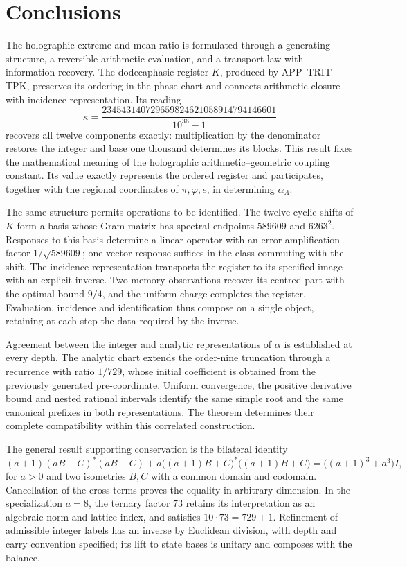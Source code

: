\section{Conclusions}
\label{paper:conclusiones}
The holographic extreme and mean ratio is formulated through a generating structure, a reversible arithmetic evaluation, and a transport law with information recovery. The dodecaphasic register \(K\), produced by APP--TRIT--TPK, preserves its ordering in the phase chart and connects arithmetic closure with incidence representation. Its reading
\[
\kappa=
\frac{234543140729659824621058914794146601}{10^{36}-1}
\]
recovers all twelve components exactly: multiplication by the denominator restores the integer and base one thousand determines its blocks. This result fixes the mathematical meaning of the holographic arithmetic--geometric coupling constant. Its value exactly represents the ordered register and participates, together with the regional coordinates of \(\pi,\varphi,e\), in determining \(\alpha_A\).

The same structure permits operations to be identified. The twelve cyclic shifts of \(K\) form a basis whose Gram matrix has spectral endpoints \(589609\) and \(6263^2\). Responses to this basis determine a linear operator with an error-amplification factor \(1/\sqrt{589609}\); one vector response suffices in the class commuting with the shift. The incidence representation transports the register to its specified image with an explicit inverse. Two memory observations recover its centred part with the optimal bound \(9/4\), and the uniform charge completes the register. Evaluation, incidence and identification thus compose on a single object, retaining at each step the data required by the inverse.

Agreement between the integer and analytic representations of \(\alpha\) is established at every depth. The analytic chart extends the order-nine truncation through a recurrence with ratio \(1/729\), whose initial coefficient is obtained from the previously generated pre-coordinate. Uniform convergence, the positive derivative bound and nested rational intervals identify the same simple root and the same canonical prefixes in both representations. The theorem determines their complete compatibility within this correlated construction.

The general result supporting conservation is the bilateral identity
\[
 (a+1)(aB-C)^*(aB-C)
 +a\bigl((a+1)B+C\bigr)^*\bigl((a+1)B+C\bigr)
 =\bigl((a+1)^3+a^3\bigr)I,
\]
for \(a>0\) and two isometries \(B,C\) with a common domain and codomain. Cancellation of the cross terms proves the equality in arbitrary dimension. In the specialization \(a=8\), the ternary factor \(73\) retains its interpretation as an algebraic norm and lattice index, and satisfies \(10\cdot73=729+1\). Refinement of admissible integer labels has an inverse by Euclidean division, with depth and carry convention specified; its lift to state bases is unitary and composes with the balance.

